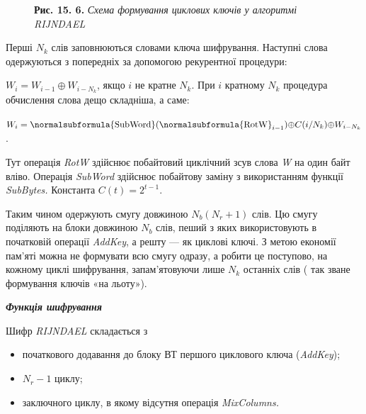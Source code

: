 {\centering \par}

\begin{figure}
\centering
\begin{minipage}{}
{\centering
\textbf{Рис. 15. 6.} \textit{Схема формування циклових ключів у алгоритмі
}\textit{RIJNDAEL}
\par}
\end{minipage}
\end{figure}
Перші  ${N_{{k}}}$ слів заповнюються словами ключа шифрування. Наступні слова
одержуються з попередніх за допомогою рекурентної процедури:

 ${W_{{i}}=W_{{i-1}}{\oplus}W_{{i-N_{{k}}}}}$, якщо  ${i}$ не кратне 
${N_{{k}}}$. При  ${i}$ кратному  ${N_{{k}}}$ процедура обчислення слова дещо
складніша, а саме:

{\centering

${W_{{i}}=\normalsubformula{\text{SubWord}}(\normalsubformula{\text{RotW}}_{{i-1}}){\oplus}C(i/N_{{k}}){\oplus}W_{{i-N_{{k}}}}}$.
\par}

Тут операція\textit{ }\textit{RotW} здійснює побайтовий циклічний зсув слова
\textit{W}\textit{ }на один байт вліво. Операція \textit{SubWord} здійснює
побайтову заміну з використанням функції \textit{SubBytes}\textit{.} Константа 
${C(t)=2^{{t-1}}}$.

Таким чином одержують смугу довжиною  ${N_{{b}}(N_{{r}}+1)}$ слів. Цю смугу
поділяють на блоки довжиною  ${N_{{b}}}$ слів, пеший з яких використовують в
початковій операції \textit{AddKey}, а решту --- як циклові ключі. З метою
економії пам’яті можна не формувати всю смугу одразу, а робити це поступово, на
кожному циклі шифрування, запам’ятовуючи лише  ${N_{{k}}}$ останніх слів ( так
зване формування ключів «на льоту»).


\bigskip


\bigskip

{\centering\bfseries\itshape
Функція шифрування
\par}


\bigskip


\bigskip

Шифр \textit{RIJNDAEL} складається з 

\liststyleWWviiiNumxxxiii
\begin{itemize}
\item початкового додавання до блоку ВТ першого циклового ключа
(\textit{AddKey});
\item  ${N_{{r}}-1}$ циклу;
\item заключного циклу, в якому відсутня операція \textit{MixColumns.}
\end{itemize}

